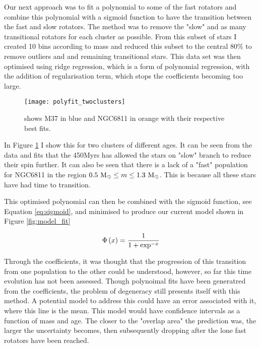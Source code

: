\documentclass[fleqn,usenatbib]{mnras}
\begin{document}
Our next approach was to fit a polynomial to some of the fast rotators and combine this polynomial with a sigmoid function to have the transition between the fast and slow rotators.
The method was to remove the "slow" and as many transitional rotators for each cluster as possible.
From this subset of stars I created 10 bins according to mass and reduced this subset to the central 80\% to remove outliers and and remaining transitional stars.
This data set was then optimised using ridge regression, which is a form of polynomial regression, with the addition of regularisation term, which stops the coefficients becoming too large.

\begin{figure}
	\texttt{[image: polyfit\_twoclusters]}
	\caption{shows M37 in blue and NGC6811 in orange with their respective best fits.}
	\label{fig:polyfit_twoclusters}
\end{figure}

In Figure \ref{fig:polyfit_twoclusters} I show this for two clusters of different ages.
It can be seen from the data and fits that the 450Myrs has allowed the stars on "slow" branch to reduce their spin further.
It can also be seen that there is a lack of a "fast" population for NGC6811 in the region $0.5~\textup{M}_\odot \leq m \leq 1.3~\textup{M}_\odot$.
This is because all these stars have had time to transition.

This optimised polynomial can then be combined with the sigmoid function, see Equation \ref{eq:sigmoid}, and minimised to produce our current model shown in Figure \ref{fig:model_fit}

\begin{align}
	\centering
	\label{eq:sigmoid}
	\Phi\left(x\right) = \frac{1}{1 + \exp^{-x}}
\end{align}

Through the coefficients, it was thought that the progression of this transition from one population to the other could be understood, however, so far this time evolution has not been assessed.
Though polynoimal fits have been generatred from the coefficients, the problem of degeneracy still presents itself with this method. 
A potential model to address this could have an error associated with it, where this line is the mean.
This model would have confidence intervals as a function of mass and age.
The closer to the "overlap area" the prediction was, the larger the uncertainty becomes, then subsequently dropping after the lone fast rotators have been reached.
\end{document}
